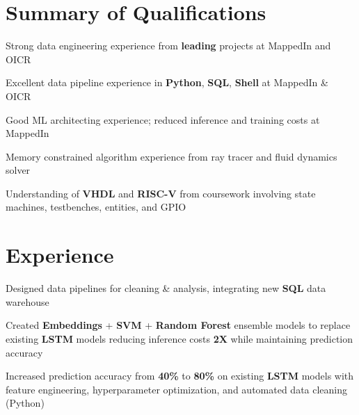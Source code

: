 \documentclass[]{chandan-cv}
\begin{document}
\hfill
\begin{minipage}[t]{0.75\textwidth}


\section{Summary of Qualifications}
\runsubsection{ }
\descript{ }
\location{ }
\vspace{\topsep} %
\begin{tightemize}
	\item Strong data engineering experience from \textbf{leading} projects at MappedIn and OICR
	\item Excellent data pipeline experience in \textbf{Python}, \textbf{SQL}, \textbf{Shell} at MappedIn \& OICR
	\item Good ML architecting experience; reduced inference and training costs at MappedIn
	\item Memory constrained algorithm experience from ray tracer and fluid dynamics solver
	\item Understanding of \textbf{VHDL} and \textbf{RISC-V} from coursework involving 
	state machines, testbenches, entities, and GPIO
\end{tightemize}
\sectionsep


\section{Experience}

\begin{tightemize}
        \item Designed data pipelines for cleaning \& analysis, integrating new \textbf{SQL} data warehouse
		\item Created \textbf{Embeddings} + \textbf{SVM} + \textbf{Random Forest} ensemble models to replace existing 
		\textbf{LSTM} models reducing inference costs \textbf{2X} while maintaining prediction accuracy
		\item Increased prediction accuracy from \textbf{40\%} to \textbf{80\%} on existing \textbf{LSTM} 
		models with feature engineering, hyperparameter optimization, and automated data cleaning (Python)
\end{tightemize}
\sectionsep


\end{minipage}
\end{document}
